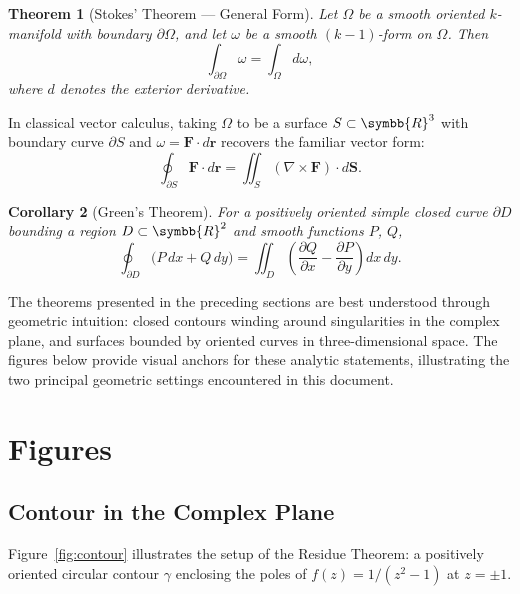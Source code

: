 \documentclass{article}
\newtheorem{theorem}{Theorem}[section]
\newtheorem{corollary}[theorem]{Corollary}
\begin{document}
\begin{theorem}[Stokes' Theorem --- General Form]
  Let $\Omega$ be a smooth oriented $k$-manifold with boundary $\partial\Omega$,
  and let $\omega$ be a smooth $(k-1)$-form on $\Omega$.  Then
  \begin{equation}
    \int_{\partial\Omega} \omega = \int_{\Omega} d\omega,
  \end{equation}
  where $d$ denotes the exterior derivative.
\end{theorem}

In classical vector calculus, taking $\Omega$ to be a surface $S \subset \symbb{R}^{3}$
with boundary curve $\partial S$ and $\omega = \mathbf{F} \cdot d\mathbf{r}$ recovers
the familiar vector form:
\begin{equation}
  \oint_{\partial S} \mathbf{F} \cdot d\mathbf{r}
    = \iint_{S} (\nabla \times \mathbf{F}) \cdot d\mathbf{S}.
\end{equation}

\begin{corollary}[Green's Theorem]
  For a positively oriented simple closed curve $\partial D$ bounding a region
  $D \subset \symbb{R}^{2}$ and smooth functions $P$, $Q$,
  \begin{equation}
    \oint_{\partial D} \bigl(P\,dx + Q\,dy\bigr)
      = \iint_{D} \left(\frac{\partial Q}{\partial x}
                       - \frac{\partial P}{\partial y}\right)dx\,dy.
  \end{equation}
\end{corollary}

The theorems presented in the preceding sections are best understood through geometric
intuition: closed contours winding around singularities in the complex plane, and
surfaces bounded by oriented curves in three-dimensional space. The figures below
provide visual anchors for these analytic statements, illustrating the two principal
geometric settings encountered in this document.

\section{Figures}

\subsection{Contour in the Complex Plane}

Figure~\ref{fig:contour} illustrates the setup of the Residue Theorem: a positively
oriented circular contour $\gamma$ enclosing the poles of $f(z) = 1/(z^{2}-1)$
at $z = \pm 1$.
\end{document}
